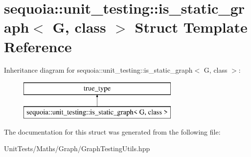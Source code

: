 \hypertarget{structsequoia_1_1unit__testing_1_1is__static__graph}{}\section{sequoia\+::unit\+\_\+testing\+::is\+\_\+static\+\_\+graph$<$ G, class $>$ Struct Template Reference}
\label{structsequoia_1_1unit__testing_1_1is__static__graph}
Inheritance diagram for sequoia\+::unit\+\_\+testing\+::is\+\_\+static\+\_\+graph$<$ G, class $>$\+:\begin{figure}[H]
\begin{center}
\leavevmode
\includegraphics[height=2.000000cm]{structsequoia_1_1unit__testing_1_1is__static__graph}
\end{center}
\end{figure}


The documentation for this struct was generated from the following file\+:\begin{DoxyCompactItemize}
\item 
Unit\+Tests/\+Maths/\+Graph/Graph\+Testing\+Utils.\+hpp\end{DoxyCompactItemize}
